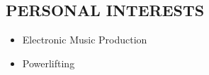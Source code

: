 \documentclass[margin]{res}
\begin{document}
\begin{resume}
\section{PERSONAL INTERESTS}

   \begin{itemize}
      \item Electronic Music Production
      \item Powerlifting
   \end{itemize}

\end{resume}
\end{document}
